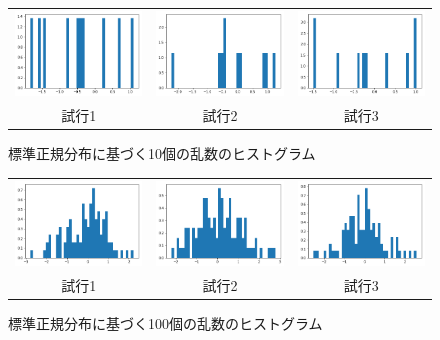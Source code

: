 \begin{figure}[h]
  \begin{center}
    \begin{tabular}{ccc}
      \includegraphics[width=0.32\hsize]{figure/10_1.png} &
      \includegraphics[width=0.32\hsize]{figure/10_2.png} &
      \includegraphics[width=0.32\hsize]{figure/10_3.png} \\
      試行1 & 試行2 &試行3
    \end{tabular}
    \caption{標準正規分布に基づく10個の乱数のヒストグラム}
    \label{figure1}
  \end{center}
\end{figure}
\begin{figure}[h]
  \begin{center}
    \begin{tabular}{ccc}
      \includegraphics[width=0.32\hsize]{figure/100_1.png} &
      \includegraphics[width=0.32\hsize]{figure/100_2.png} &
      \includegraphics[width=0.32\hsize]{figure/100_3.png} \\
      試行1 & 試行2 &試行3
    \end{tabular}
    \caption{標準正規分布に基づく100個の乱数のヒストグラム}
    \label{figure1}
  \end{center}
\end{figure}

